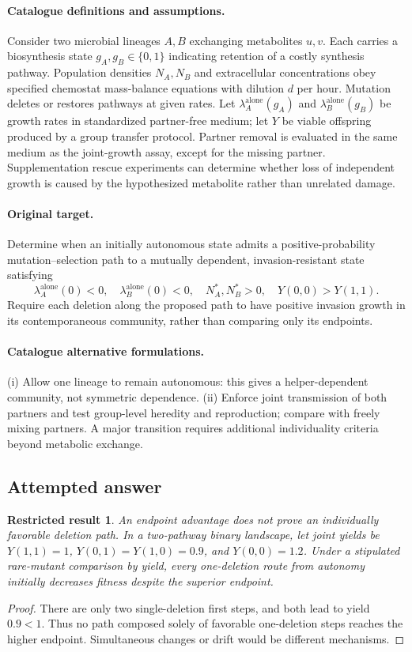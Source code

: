 \documentclass[11pt]{article}
\newtheorem{attemptresult}{Restricted result}[section]
\begin{document}
\paragraph{Catalogue definitions and assumptions.}
Consider two microbial lineages $A,B$ exchanging metabolites $u,v$. Each carries a biosynthesis state $g_A,g_B\in\{0,1\}$ indicating retention of a costly synthesis pathway. Population densities $N_A,N_B$ and extracellular concentrations obey specified chemostat mass-balance equations with dilution $d$ per hour. Mutation deletes or restores pathways at given rates. Let $\lambda_A^{\mathrm{alone}}(g_A)$ and $\lambda_B^{\mathrm{alone}}(g_B)$ be growth rates in standardized partner-free medium; let $Y$ be viable offspring produced by a group transfer protocol. Partner removal is evaluated in the same medium as the joint-growth assay, except for the missing partner. Supplementation rescue experiments can determine whether loss of independent growth is caused by the hypothesized metabolite rather than unrelated damage.
\paragraph{Original target.}
Determine when an initially autonomous state admits a positive-probability mutation--selection path to a mutually dependent, invasion-resistant state satisfying
\[
 \lambda_A^{\mathrm{alone}}(0)<0,\quad
 \lambda_B^{\mathrm{alone}}(0)<0,\quad
 N_A^*,N_B^*>0,\quad Y(0,0)>Y(1,1).
\]
Require each deletion along the proposed path to have positive invasion growth in its contemporaneous community, rather than comparing only its endpoints.
\paragraph{Catalogue alternative formulations.}
(i) Allow one lineage to remain autonomous: this gives a helper-dependent community, not symmetric dependence. (ii) Enforce joint transmission of both partners and test group-level heredity and reproduction; compare with freely mixing partners. A major transition requires additional individuality criteria beyond metabolic exchange.
\subsection{Attempted answer}
\begin{attemptresult}
An endpoint advantage does not prove an individually favorable deletion path. In a two-pathway binary landscape, let joint yields be $Y(1,1)=1$, $Y(0,1)=Y(1,0)=0.9$, and $Y(0,0)=1.2$. Under a stipulated rare-mutant comparison by yield, every one-deletion route from autonomy initially decreases fitness despite the superior endpoint.
\end{attemptresult}
\begin{proof}
There are only two single-deletion first steps, and both lead to yield $0.9<1$. Thus no path composed solely of favorable one-deletion steps reaches the higher endpoint. Simultaneous changes or drift would be different mechanisms.
\end{proof}
\end{document}
